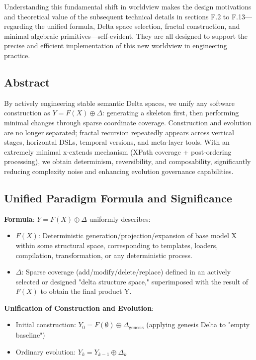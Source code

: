 \documentclass[11pt]{article}
\begin{document}
Understanding this fundamental shift in worldview makes the design motivations and theoretical value of the subsequent technical details in sections F.2 to F.13---regarding the unified formula, Delta space selection, fractal construction, and minimal algebraic primitives---self-evident. They are all designed to support the precise and efficient implementation of this new worldview in engineering practice.

\subsection{Abstract}

By actively engineering stable semantic Delta spaces, we unify any software construction as $Y = F(X) \oplus \Delta$: generating a skeleton first, then performing minimal changes through sparse coordinate coverage. Construction and evolution are no longer separated; fractal recursion repeatedly appears across vertical stages, horizontal DSLs, temporal versions, and meta-layer tools. With an extremely minimal x-extends mechanism (XPath coverage + post-ordering processing), we obtain determinism, reversibility, and composability, significantly reducing complexity noise and enhancing evolution governance capabilities.

\subsection{Unified Paradigm Formula and Significance}

\textbf{Formula}: $Y = F(X) \oplus \Delta$ uniformly describes:

\begin{itemize}
\item \textbf{$F(X)$}: Deterministic generation/projection/expansion of base model X within some structural space, corresponding to templates, loaders, compilation, transformation, or any deterministic process.
\item \textbf{$\Delta$}: Sparse coverage (add/modify/delete/replace) defined in an actively selected or designed "delta structure space," superimposed with the result of $F(X)$ to obtain the final product Y.
\end{itemize}

\textbf{Unification of Construction and Evolution}:

\begin{itemize}
\item Initial construction: $Y_0 = F(\emptyset) \oplus \Delta_{\text{genesis}}$ (applying genesis Delta to "empty baseline")
\item Ordinary evolution: $Y_k = Y_{k-1} \oplus \Delta_k$
\end{itemize}
\end{document}
